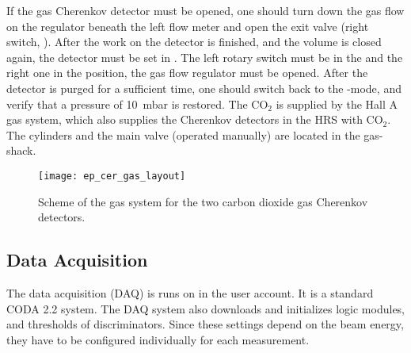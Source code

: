 {{If the gas Cherenkov detector must be opened, one should turn down the gas flow
on the regulator beneath the left flow meter and open the exit valve (right switch, ). 
After the work on the detector is finished,
and the volume is closed again, the detector must be set in .
The left rotary switch must be in the  and the right one in the
 position, the gas flow regulator must be opened. After the 
detector is purged for a sufficient time, one should switch back to the -mode,
and verify that a pressure of 10~mbar is restored. The CO$_2$ is supplied by the Hall A 
gas system, which also supplies the Cherenkov detectors in the HRS with CO$_2$. The cylinders
and the main valve (operated manually) are located in the gas-shack.

\begin{figure}[bht]
    \begin{center}
        \texttt{[image: ep\_cer\_gas\_layout]}
    \end{center}
    \caption[eP: Layout of CO2 Gas System]{
	    Scheme of the gas system for the two carbon dioxide gas Cherenkov detectors.
            }
    \label{fig:ep_cer_gas_layout} 
\end{figure}  

}

\subsection{Data Acquisition}
\label{sec:ep_daq}

The data acquisition (DAQ) is runs on  in the
 user account. It is a standard CODA 2.2 system.
The DAQ system also downloads and initializes logic modules,
and thresholds of discriminators. Since these settings depend
on the beam energy, they have to be configured individually for 
each measurement.
}

